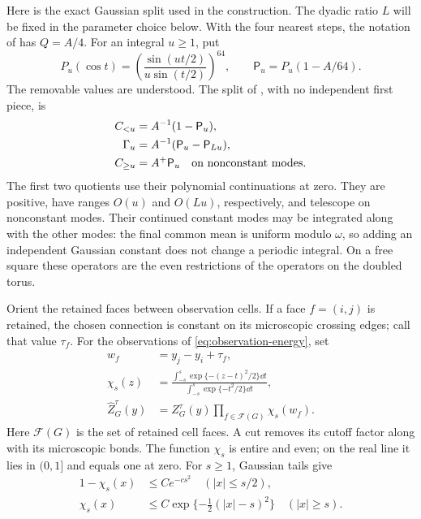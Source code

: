 Here is the exact Gaussian split used in the construction.  The
dyadic ratio \(L\) will be fixed in the parameter choice below.  With the
four nearest steps, the notation of \cite[Section~8]{B} has
\(Q=A/4\).  For an integral \(u\ge1\), put
\[
 P_u(\cos t)=
   \left(\frac{\sin(ut/2)}{u\sin(t/2)}\right)^{64},
 \qquad \mathsf P_u=P_u(1-A/64).
\]
The removable values are understood.  The split of
\cite[Equation~(9.11)]{B}, with no independent first piece, is
\begin{equation}\label{ent:reference-split}
\begin{split}
 C_{<u}&=A^{-1}(1-\mathsf P_u),\\
 \Gamma_u&=A^{-1}(\mathsf P_u-\mathsf P_{Lu}),\\
 C_{\ge u}&=A^+\mathsf P_u\quad\hbox{on nonconstant modes}.
\end{split}
\end{equation}
The first two quotients use their polynomial continuations at zero.
They are positive, have ranges \(O(u)\) and \(O(Lu)\), respectively,
and telescope on nonconstant modes.  Their continued constant modes
may be integrated along with the other modes: the final common mean is
uniform modulo \(\omega\), so adding an independent Gaussian constant
does not change a periodic integral.  On a free square these operators
are the even restrictions of the operators on the doubled torus.

Orient the retained faces between observation cells.  If a face
\(f=(i,j)\) is retained, the chosen connection is constant on its
microscopic crossing edges; call that value \(\tau_f\).  For the
observations of \eqref{eq:observation-energy}, set
\begin{equation}\label{ent:cutoff-definition}
\begin{split}
 w_f&=y_j-y_i+\tau_f,\\
 \chi_s(z)&=
 \frac{\displaystyle\int_{-s}^{s}\exp\{-(z-t)^2/2\}\dd t}
      {\displaystyle\int_{-s}^{s}\exp\{-t^2/2\}\dd t},\\
 \widehat Z_G^\tau(y)&=
          Z_G^\tau(y)\prod_{f\in\mathcal F(G)}\chi_s(w_f).
\end{split}
\end{equation}
Here \(\mathcal F(G)\) is the set of retained cell faces.  A cut
removes its cutoff factor along with its microscopic bonds.
The function \(\chi_s\) is entire and even; on the real line it lies
in \((0,1]\) and equals one at zero.  For \(s\ge1\), Gaussian tails
give
\begin{equation}\label{ent:cutoff-tails}
\begin{split}
 1-\chi_s(x)&\le Ce^{-cs^2}\quad (|x|\le s/2),\\
 \chi_s(x)&\le C\exp\{-\tfrac12(|x|-s)^2\}
                                  \quad (|x|\ge s).
\end{split}
\end{equation}


